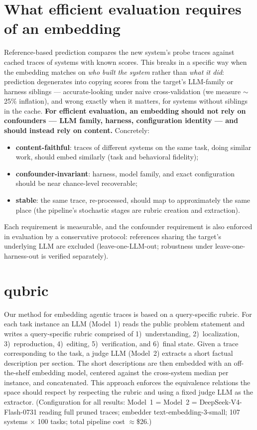 \documentclass[10pt,twocolumn]{article}
\begin{document}
\section*{What efficient evaluation requires of an embedding}
Reference-based prediction compares the new system's probe traces against
cached traces of systems with known scores. This breaks in a specific way
when the embedding matches on \emph{who built the system} rather than
\emph{what it did}: prediction degenerates into copying scores from the
target's LLM-family or harness siblings --- accurate-looking under naive
cross-validation (we measure $\sim$25\% inflation), and wrong exactly when
it matters, for systems without siblings in the cache. \textbf{For
efficient evaluation, an embedding should not rely on confounders --- LLM
family, harness, configuration identity --- and should instead rely on
content.} Concretely:
\begin{itemize}[leftmargin=1.2em,itemsep=1pt,topsep=1pt]
  \item \textbf{content-faithful}: traces of different systems on the same
  task, doing similar work, should embed similarly (task and behavioral
  fidelity);
  \item \textbf{confounder-invariant}: harness, model family, and exact
  configuration should be near chance-level recoverable;
  \item \textbf{stable}: the same trace, re-processed, should map to
  approximately the same place (the pipeline's stochastic stages are
  rubric creation and extraction).
\end{itemize}
Each requirement is measurable, and the confounder requirement is also
enforced in evaluation by a conservative protocol: references sharing the
target's underlying LLM are excluded (leave-one-LLM-out; robustness under
leave-one-harness-out is verified separately).

\section*{qubric}
Our method for embedding agentic traces is based on a query-specific
rubric. For each task instance an LLM (Model~1) reads the public problem
statement and writes a query-specific rubric comprised of
1)~understanding, 2)~localization, 3)~reproduction, 4)~editing,
5)~verification, and 6)~final state. Given a trace corresponding to the
task, a judge LLM (Model~2) extracts a short factual description per
section. The short descriptions are then embedded with an off-the-shelf
embedding model, centered against the cross-system median per instance,
and concatenated. This approach enforces the equivalence relations the
space should respect by respecting the rubric and using a fixed judge LLM
as the extractor. (Configuration for all results: Model~1 = Model~2 =
DeepSeek-V4-Flash-0731 reading full pruned traces; embedder
text-embedding-3-small; 107 systems $\times$ 100 tasks; total pipeline
cost $\approx$\$26.)
\end{document}
